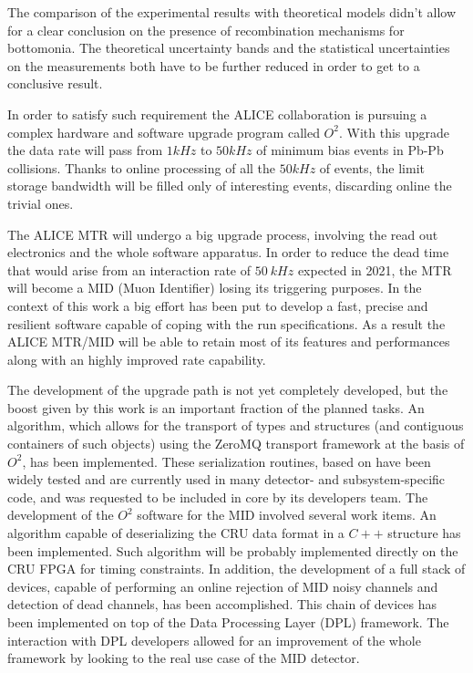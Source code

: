 The comparison of the experimental results with theoretical models didn't allow for a clear conclusion on the presence of recombination mechanisms for bottomonia.
The theoretical uncertainty bands and the statistical uncertainties on the measurements both have to be further reduced in order to get to a conclusive result.


In order to satisfy such requirement the ALICE collaboration is pursuing a complex hardware and software upgrade program called $O^2$.
With this upgrade the data rate will pass from $1kHz$ to $50 kHz$ of minimum bias events in Pb-Pb collisions.
Thanks to online processing of all the $50 kHz$ of events, the limit storage bandwidth will be filled only of interesting events, discarding online the trivial ones.

The ALICE MTR will undergo a big upgrade process, involving the read out electronics and the whole software apparatus.
In order to reduce the dead time that would arise from an interaction rate of $50\ kHz$ expected in 2021, the MTR will become a MID (Muon Identifier) losing its triggering purposes.
In the context of this work a big effort has been put to develop a fast, precise and resilient software capable of coping with the run specifications.
As a result the ALICE MTR/MID will be able to retain most of its features and performances along with an highly improved rate capability.

The development of the upgrade path is not yet completely developed, but the boost given by this work is an important fraction of the planned tasks.
An algorithm, which allows for the transport of  types and structures (and contiguous containers of such objects) using the ZeroMQ transport framework at the basis of $O^2$, has been implemented.
These serialization routines, based on  have been widely tested and are currently used in many detector- and subsystem-specific code, and was requested to be included in  core by its developers team.
The development of the $O^2$ software for the MID involved several work items.
An algorithm capable of deserializing the CRU data format in a $C++$ structure has been implemented.
Such algorithm will be probably implemented directly on the CRU FPGA for timing constraints.
In addition, the development of a full stack of devices, capable of performing an online rejection of MID noisy channels and detection of dead channels, has been accomplished.
This chain of devices has been implemented on top of the Data Processing Layer (DPL) framework.
The interaction with DPL developers allowed for an improvement of the whole framework by looking to the real use case of the MID detector.

